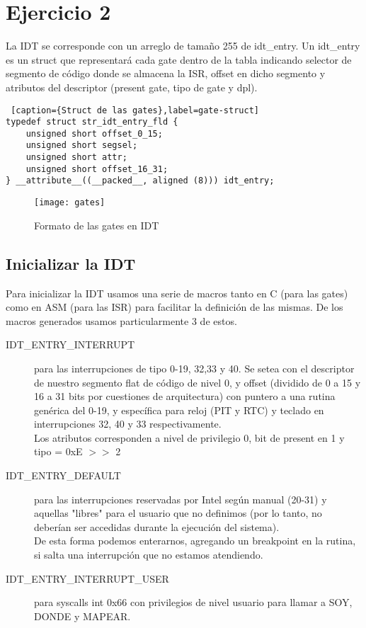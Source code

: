 \section{Ejercicio 2}

La IDT se corresponde con un arreglo de tamaño 255 de idt_entry. Un idt_entry es un struct que representará cada gate dentro de la tabla indicando selector de segmento de código donde se almacena la ISR, offset en dicho segmento y atributos del descriptor (present gate, tipo de gate y dpl). 

\begin{lstlisting} [caption={Struct de las gates},label=gate-struct]
typedef struct str_idt_entry_fld {
    unsigned short offset_0_15;
    unsigned short segsel;
    unsigned short attr;
    unsigned short offset_16_31;
} __attribute__((__packed__, aligned (8))) idt_entry;
\end{lstlisting}

\begin{figure}[H]
    \centering
    \texttt{[image: gates]}
    \caption{Formato de las gates en IDT}
    \label{fig:gates}
\end{figure}



\subsection{Inicializar la IDT}

Para inicializar la IDT usamos una serie de macros tanto en C (para las gates) como en ASM (para las ISR) para facilitar la definición de las mismas.
De los macros generados usamos particularmente 3 de estos.
\begin{description}
\item [IDT_ENTRY_INTERRUPT] para las interrupciones de tipo 0-19, 32,33 y 40. Se setea con el descriptor de nuestro segmento flat de código de nivel 0, y offset (dividido de 0 a 15 y 16 a 31 bits por cuestiones de arquitectura) con puntero a una rutina genérica del 0-19, y específica para reloj (PIT y RTC) y teclado en interrupciones 32, 40 y 33 respectivamente. \\
Los atributos corresponden a nivel de privilegio 0, bit de present en 1 y tipo = 0xE $>>$ 2
\item [IDT_ENTRY_DEFAULT] para las interrupciones reservadas por Intel según manual (20-31) y aquellas "libres" para el usuario que no definimos (por lo tanto, no deberían ser accedidas durante la ejecución del sistema). \\
De esta forma podemos enterarnos, agregando un breakpoint en la rutina, si salta una interrupción que no estamos atendiendo.
\item [IDT_ENTRY_INTERRUPT_USER] para syscalls int 0x66 con privilegios de nivel usuario para llamar a SOY, DONDE y MAPEAR.
\end{description} 

